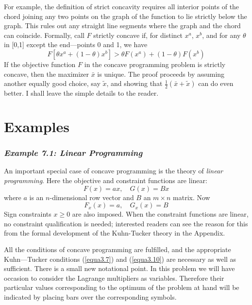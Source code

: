 For example, the definition of strict concavity requires all interior points of the chord joining any two points on the graph of the function to lie strictly below the graph. This rules out any straight line segments where the graph and the chord can coincide. Formally, call $F$ strictly concave if, for distinct $x^a$, $x^b$, and for any $\theta$ in [0,1] except the end—points 0 and 1, we have
\begin{equation} \label{equa7.12}
 F[\theta x^a + (1-\theta)x^b] > \theta F(x^a) + (1-\theta) F(x^b)
\end{equation}
If the objective function $F$ in the concave programming problem is strictly concave, then the maximizer $\bar{x}$ is unique. The proof proceeds by assuming another equally good choice, say $\tilde{x}$, and showing that $\frac{1}{2} (\bar{x} + \tilde{x}) $ can do even better. I shall leave the simple details to the reader.

\section*{Examples}

\subsubsection*{\textit{Example 7.1: Linear Programming}}

An important special case of concave programming is the theory of \textit{linear programming}. Here the objective and constraint functions are linear:
\begin{equation*}
F(x) = ax, \quad G(x) = Bx
\end{equation*}
where $a$ is an $n$-dimensional row vector and $B$ an $m \times n$ matrix. Now
\begin{equation*}
F_x(x) = a, \quad G_x(x) = B
\end{equation*}
Sign constraints $x \geq 0$ are also imposed. When the constraint functions are linear, no constraint qualification is needed; interested readers can see the reason for this from the formal development of the Kuhn-Tucker theory in the Appendix.

All the conditions of concave programming are fulfilled, and the appropriate Kuhn—Tucker conditions (\ref{equa3.7}) and (\ref{equa3.10}) are necessary as well as sufficient. There is a small new notational point. In this problem we will have occasion to consider the Lagrange multipliers as variables. Therefore their particular values corresponding to the optimum of the problem at hand will be indicated by placing bars over the corresponding symbols.

